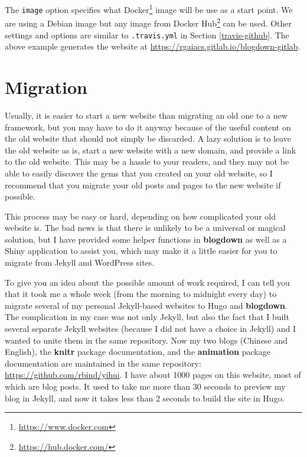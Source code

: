 \documentclass[12pt,]{krantz}
\renewcommand{\href}[2]{#2\footnote{\url{#1}}}
\theoremstyle{definition}
\theoremstyle{definition}
\theoremstyle{definition}
\theoremstyle{remark}
\begin{document}
The \texttt{image} option specifies what
\href{https://www.docker.com}{Docker} image will be use as a start
point. We are using a Debian image but any image from
\href{https://hub.docker.com/}{Docker Hub} can be used. Other settings
and options are similar to \texttt{.travis.yml} in Section
\ref{travis-github}. The above example generates the website at
\url{https://rgaiacs.gitlab.io/blogdown-gitlab}.

\hypertarget{migration}{%
\chapter{Migration}\label{migration}}

Usually, it is easier to start a new website than
migrating an old one to a new framework, but you
may have to do it anyway because of the useful content on the old
website that should not simply be discarded. A lazy solution is to leave
the old website as is, start a new website with a new domain, and
provide a link to the old website. This may be a hassle to your readers,
and they may not be able to easily discover the gems that you created on
your old website, so I recommend that you migrate your old posts and
pages to the new website if possible.

This process may be easy or hard, depending on how complicated your old
website is. The bad news is that there is unlikely to be a universal or
magical solution, but I have provided some helper functions in
\textbf{blogdown} as well as a Shiny application to assist you, which
may make it a little easier for you to migrate from Jekyll and WordPress
sites.

To give you an idea about the possible amount of work required, I can
tell you that it took me a whole week (from the morning to midnight
every day) to migrate several of my personal Jekyll-based websites to
Hugo and \textbf{blogdown}. The complication in my case was not only
Jekyll, but also the fact that I built several separate Jekyll websites
(because I did not have a choice in Jekyll) and I wanted to unite them
in the same repository. Now my two blogs (Chinese and English), the
\textbf{knitr} \citep{R-knitr} package documentation, and the
\textbf{animation} package \citep{R-animation} documentation are
maintained in the same repository: \url{https://github.com/rbind/yihui}.
I have about 1000 pages on this website, most of which are blog posts.
It used to take me more than 30 seconds to preview my blog in Jekyll,
and now it takes less than 2 seconds to build the site in Hugo.
\end{document}
